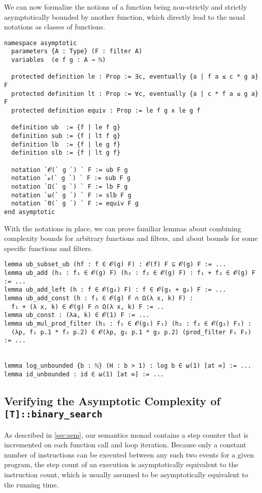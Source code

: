 We can now formalize the notions of a function being non-strictly and strictly
asymptotically bounded by another function, which directly lead to the usual
notations as classes of functions.

\begin{verbatim}
namespace asymptotic
  parameters {A : Type} (F : filter A)
  variables  (e f g : A → ℕ)

  protected definition le : Prop := ∃c, eventually {a | f a ≤ c * g a} F
  protected definition lt : Prop := ∀c, eventually {a | c * f a ≤ g a} F
  protected definition equiv : Prop := le f g ∧ le g f

  definition ub  := {f | le f g}
  definition sub := {f | lt f g}
  definition lb  := {f | le g f}
  definition slb := {f | lt g f}

  notation `𝓞(` g `) ` F := ub F g
  notation `𝓸(` g `) ` F := sub F g
  notation `Ω(` g `) ` F := lb F g
  notation `ω(` g `) ` F := slb F g
  notation `Θ(` g `) ` F := equiv F g
end asymptotic
\end{verbatim}

With the notations in place, we can prove familiar lemmas about combining
complexity bounds for arbitrary functions and filters, and about bounds for some
specific functions and filters.

\begin{verbatim}
lemma ub_subset_ub (hf : f ∈ 𝓞(g) F) : 𝓞(f) F ⊆ 𝓞(g) F := ...
lemma ub_add (h₁ : f₁ ∈ 𝓞(g) F) (h₂ : f₂ ∈ 𝓞(g) F) : f₁ + f₂ ∈ 𝓞(g) F := ...
lemma ub_add_left (h : f ∈ 𝓞(g₂) F) : f ∈ 𝓞(g₁ + g₂) F := ...
lemma ub_add_const (h : f₁ ∈ 𝓞(g) F ∩ Ω(λ x, k) F) :
  f₁ + (λ x, k) ∈ 𝓞(g) F ∩ Ω(λ x, k) F := ..
lemma ub_const : (λa, k) ∈ 𝓞(1) F := ...
lemma ub_mul_prod_filter (h₁ : f₁ ∈ 𝓞(g₁) F₁) (h₂ : f₂ ∈ 𝓞(g₂) F₂) :
  (λp, f₁ p.1 * f₂ p.2) ∈ 𝓞(λp, g₁ p.1 * g₂ p.2) (prod_filter F₁ F₂) := ...


lemma log_unbounded {b : ℕ} (H : b > 1) : log b ∈ ω(1) [at ∞] := ...
lemma id_unbounded : id ∈ ω(1) [at ∞] := ...
\end{verbatim}

\subsection{Verifying the Asymptotic Complexity of \texttt{[T]::binary\_search}}

As described in \autoref{sec:sem}, our semantics monad contains a step counter
that is incremented on each function call and loop iteration. Because only a
constant number of instructions can be executed between any such two events for
a given program, the step count of an execution is asymptotically equivalent to the instruction
count, which is usually assumed to be asymptotically equivalent to the running time.

